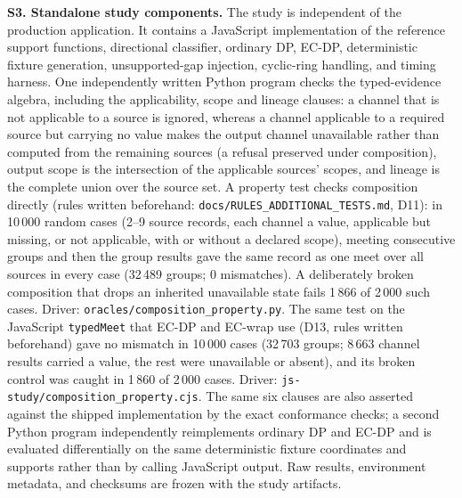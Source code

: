 \documentclass[11pt]{article}
\begin{document}
\vspace{4mm}
\noindent\textbf{S3. Standalone study components.} The study is independent of the production application. It contains a JavaScript implementation of the reference support functions, directional classifier, ordinary DP, EC-DP, deterministic fixture generation, unsupported-gap injection, cyclic-ring handling, and timing harness. One independently written Python program checks the typed-evidence algebra, including the applicability, scope and lineage clauses: a channel that is not applicable to a source is ignored, whereas a channel applicable to a required source but carrying no value makes the output channel unavailable rather than computed from the remaining sources (a refusal preserved under composition), output scope is the intersection of the applicable sources' scopes, and lineage is the complete union over the source set. A property test checks composition directly (rules written beforehand: \texttt{docs/\allowbreak RULES\_\allowbreak ADDITIONAL\_\allowbreak TESTS.md}, D11): in 10\,000 random cases (2--9 source records, each channel a value, applicable but missing, or not applicable, with or without a declared scope), meeting consecutive groups and then the group results gave the same record as one meet over all sources in every case (32\,489 groups; 0 mismatches). A deliberately broken composition that drops an inherited unavailable state fails 1\,866 of 2\,000 such cases. Driver: \texttt{oracles/composition\_property.py}. The same test on the JavaScript \texttt{typedMeet} that EC-DP and EC-wrap use (D13, rules written beforehand) gave no mismatch in 10\,000 cases (32\,703 groups; 8\,663 channel results carried a value, the rest were unavailable or absent), and its broken control was caught in 1\,860 of 2\,000 cases. Driver: \texttt{js-study/composition\_property.cjs}. The same six clauses are also asserted against the shipped implementation by the exact conformance checks; a second Python program independently reimplements ordinary DP and EC-DP and is evaluated differentially on the same deterministic fixture coordinates and supports rather than by calling JavaScript output. Raw results, environment metadata, and checksums are frozen with the study artifacts.
\end{document}
